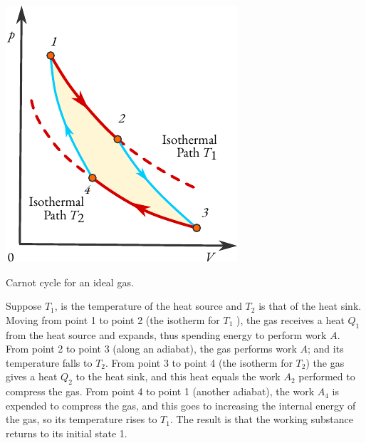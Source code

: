 \begin{marginfigure}%
\centering
\includegraphics[width=\textwidth]{figures/carnot.pdf}
\caption{Carnot cycle for an ideal gas.\label{ideal-gas}}
\end{marginfigure}

Suppose $T_{1}$, is the temperature of the heat source and $T_{2}$ is that of the heat sink. Moving from point 1 to point 2 (the isotherm for $T_{1}$ ), the gas receives a heat $Q_{1}$ from the heat source and expands, thus spending energy to perform work $A$. From point 2 to point 3 (along an adiabat), the gas performs work $A$; and its temperature falls to $T_{2}$. From point 3 to point 4 (the isotherm for $T_{2}$) the gas gives a heat $Q_{2}$ to the heat sink, and this heat equals the work $A_{2}$ performed to compress the gas. From point 4 to point 1 (another adiabat), the work $A_{4}$ is expended to compress the gas, and this goes to increasing the internal energy of the gas, so its temperature rises to $T_{1}$. The result is that the working substance returns to its initial state 1. 

